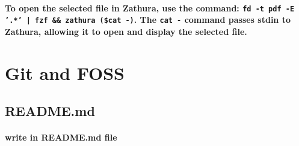 \documentclass[11pt]{article}
\begin{document}
\paragraph{\small To open the selected file in Zathura, use the command: \texttt{fd -t pdf -E '.*' | fzf \&\& zathura (\$cat -)}. The \texttt{cat -} command passes stdin to Zathura, allowing it to open and display the selected file.}

\section{Git and FOSS}
\subsection{README.md}
\paragraph{write in README.md file}
\end{document}
